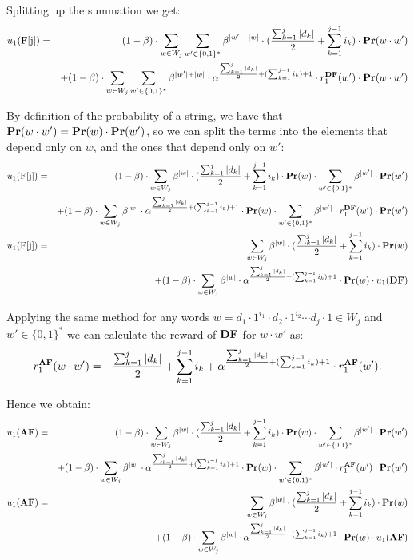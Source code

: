 Splitting up the summation we get:
\begin{eqnarray*}
u_1(\text{\rm F[{j}]})& = & (1-\beta)\cdot\sum_{w \in W_j}  \sum_{w'\in \{0,1\}^*}\beta^{|w'|+|w|}\cdot (\frac{\sum_{k=1}^{j} |d_k|}{2}+\sum_{k=1}^{j-1} i_k) \cdot \mathbf{Pr}(w\cdot w')
\\ && + (1-\beta)\cdot\sum_{w \in W_j}  \sum_{w'\in \{0,1\}^*}\beta^{|w'|+|w|}\cdot \alpha^{\frac{\sum_{k=1}^{j} |d_k|}{2}+(\sum_{k=1}^{j-1} i_k) +1}\cdot r_1^{\text{\rm {\bf DF}}}(w') \cdot \mathbf{Pr}(w\cdot w')
\end{eqnarray*}

By definition of the probability of a string, we have that $\mathbf{Pr}(w\cdot w') = \mathbf{Pr}(w)\cdot \mathbf{Pr}(w')$, so we can split the terms into the elements that depend only on $w$, and the ones that depend only on $w'$:
\begin{eqnarray*}
u_1(\text{\rm F[{j}]})& = & (1-\beta)\cdot\sum_{w \in W_j}  \beta^{|w|}\cdot (\frac{\sum_{k=1}^{j} |d_k|}{2}+\sum_{k=1}^{j-1} i_k) \cdot \mathbf{Pr}(w)\cdot \sum_{w'\in \{0,1\}^*}  \beta^{|w'|} \cdot \mathbf{Pr}(w')
\\ && + (1-\beta)\cdot\sum_{w \in W_j}  \beta^{|w|}\cdot \alpha^{\frac{\sum_{k=1}^{j} |d_k|}{2}+(\sum_{k=1}^{j-1} i_k) +1} \cdot \mathbf{Pr}(w) \cdot  \sum_{w'\in \{0,1\}^*} \beta^{|w'|} \cdot r^{\text{\rm {\bf DF}}}_1(w') \cdot\mathbf{Pr}(w') \\
u_1(\text{\rm F[{j}]})& = & \sum_{w \in W_j}  \beta^{|w|}\cdot (\frac{\sum_{k=1}^{j} |d_k|}{2}+\sum_{k=1}^{j-1} i_k) \cdot \mathbf{Pr}(w)
\\ && + (1-\beta)\cdot\sum_{w \in W_j}  \beta^{|w|}\cdot \alpha^{\frac{\sum_{k=1}^{j} |d_k|}{2}+(\sum_{k=1}^{j-1} i_k) +1} \cdot \mathbf{Pr}(w) \cdot  u_1(\text{\rm {\bf DF}}) \\
\end{eqnarray*}

Applying the same method for any words $w = d_1 \cdot 1^{i_1} \cdot d_2 \cdot 1^{i_2} \cdots d_j \cdot 1 \in W_j$ and $w' \in \{0, 1\} ^*$ we can calculate the reward of $\text{\rm {\bf DF}}$ for $w\cdot w'$ as:
\begin{eqnarray*}
r^{\text{\rm {\bf AF}}}_1(w\cdot w') & = & \frac{\sum_{k=1}^{j} |d_k|}{2}+\sum_{k=1}^{j-1} i_k + \alpha^{\frac{\sum_{k=1}^{j} |d_k|}{2}+(\sum_{k=1}^{j-1} i_k) +1}\cdot r_1^{\text{\rm {\bf AF}}}(w').
\end{eqnarray*}

Hence we obtain:
\begin{eqnarray*}
u_1(\text{\rm {\bf AF}})& = & (1-\beta)\cdot\sum_{w \in W_j}  \beta^{|w|}\cdot (\frac{\sum_{k=1}^{j} |d_k|}{2}+\sum_{k=1}^{j-1} i_k) \cdot \mathbf{Pr}(w)\cdot \sum_{w'\in \{0,1\}^*}  \beta^{|w'|} \cdot \mathbf{Pr}(w')
\\ && + (1-\beta)\cdot\sum_{w \in W_j}  \beta^{|w|}\cdot \alpha^{\frac{\sum_{k=1}^{j} |d_k|}{2}+(\sum_{k=1}^{j-1} i_k) +1} \cdot \mathbf{Pr}(w) \cdot  \sum_{w'\in \{0,1\}^*} \beta^{|w'|} \cdot r^{\text{\rm {\bf AF}}}_1(w') \cdot\mathbf{Pr}(w')\\
u_1(\text{\rm {\bf AF}})& = & \sum_{w \in W_j}  \beta^{|w|}\cdot(\frac{\sum_{k=1}^{j} |d_k|}{2}+\sum_{k=1}^{j-1} i_k)  \cdot \mathbf{Pr}(w)
\\ && + (1-\beta)\cdot\sum_{w \in W_j}  \beta^{|w|}\cdot \alpha^{\frac{\sum_{k=1}^{j} |d_k|}{2}+(\sum_{k=1}^{j-1} i_k) +1} \cdot \mathbf{Pr}(w) \cdot  u_1(\text{\rm {\bf AF}})
\end{eqnarray*}

